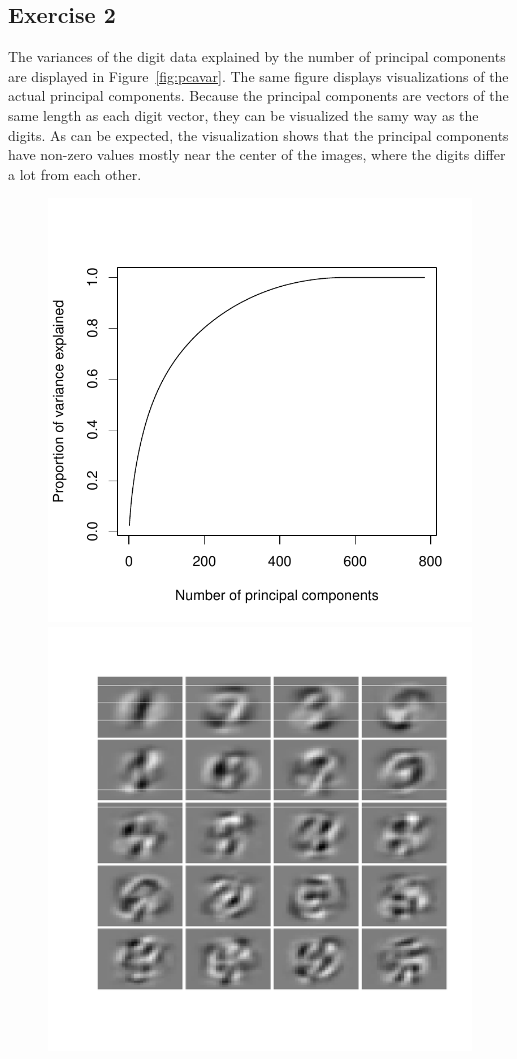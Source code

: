 \documentclass{article}
\begin{document}
\subsection{Exercise 2}
The variances of the digit data explained by the number of principal components are displayed in Figure~\ref{fig:pcavar}.
The same figure displays visualizations of the actual principal components.
Because the principal components are vectors of the same length as each digit vector, they can be visualized the samy way as the digits.
As can be expected, the visualization shows that the principal components have non-zero values mostly near the center of the images, where the digits differ a lot from each other.
\begin{figure}\centering
	\includegraphics[scale=0.6]{pcavar}
	\includegraphics[scale=0.4]{pcanums}

\end{figure}
\end{document}
